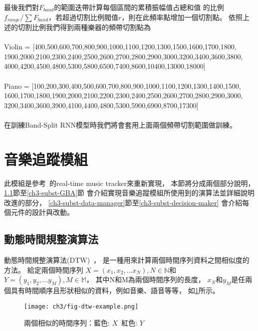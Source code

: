 \documentclass[class=NCU_thesis, crop=false]{standalone}
\begin{document}
最後我們對$F_{band}$的範圍迭帶計算每個區間的累積振幅值占總和值
的比例$f_{range}/\sum F_{band}$，若超過切割比例閥值$r$，則在此頻率點增加一個切割點。
依照上述的切割比例我們得到兩種樂器的頻帶切割點為 \\
\\
Violin = [400,500,600,700,800,900,1000,1100,1200,1300,1500,1600,1700,1800,\\
1900,2000,2100,2300,2400,2500,2600,2700,2800,2900,3000,3200,3400,3600,3800,\\
4000,4200,4500,4800,5300,5800,6500,7400,8600,10400,13000,18000]\\
\\
Piano = [100,200,300,400,500,600,700,800,900,1000,1100,1200,1300,1400,1500,\\
1600,1700,1800,1900,2000,2100,2200,2300,2400,2500,2600,2700,2800,2900,3000,\\
3200,3400,3600,3900,4100,4400,4800,5300,5900,6900,8700,17300]\\
\\
在訓練Band-Split RNN模型時我們將會套用上面兩個頻帶切割範圍做訓練。

\pagebreak

\section{音樂追蹤模組} \label{ch3-st-music-tracking-module}
此模組是參考~\cite{Lin2020AHumanComputerDuetSystem}的real-time music tracker來重新實現，
本節將分成兩個部分說明，
\ref{ch3-subst-DTW}節至\ref{ch3-subst-GBA}節
會介紹實現音樂追蹤模組所使用到的演算法並詳細說明改進的部分，
\ref{ch3-subst-data-manager}節至\ref{ch3-subst-decision-maker}
會介紹每個元件的設計與改動。

\subsection{動態時間規整演算法} \label{ch3-subst-DTW}
動態時間規整演算法(DTW)~\cite{Sakoe1978Dynamic}，
是一種用來計算兩個時間序列資料之間相似度的方法。
給定兩個時間序列
$X = (x_1, x_2, \dots x_N), N \in \mathbb{N}$和
$Y = (y_1, y_2, \dots y_M), M \in \mathbb{M}$，
其中N和M為兩個時間序列的長度，
$x_N$和$y_M$是任兩個具有時間順序且形狀相似的資料，例如音樂、語音等等，
如\cref{fig:fig-ch3-dtw-example}所示。
\begin{figure}[!hbt]
    \centering
    \texttt{[image: ch3/fig-dtw-example.png]}
    \caption{兩個相似的時間序列：藍色: $X$\ 紅色: $Y$}
    \label{fig:fig-ch3-dtw-example}
\end{figure}
\end{document}

